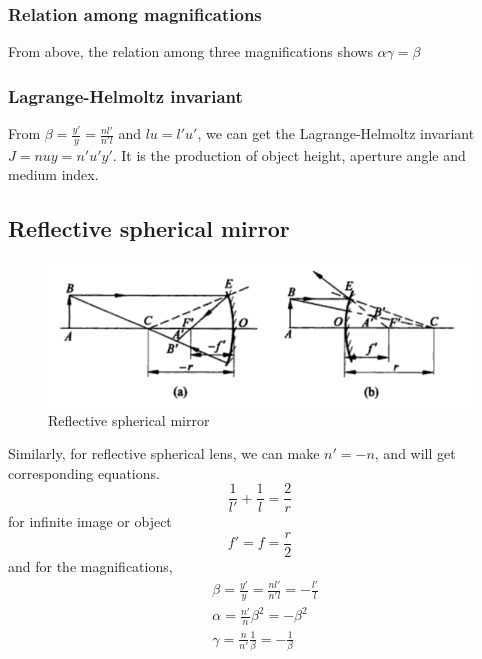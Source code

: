 \documentclass[../main.tex]{subfiles}
\begin{document}
	\subsubsection{Relation among magnifications}
	From above, the relation among three magnifications shows $\alpha\gamma=\beta$
	\subsubsection{Lagrange-Helmoltz invariant}
	From $\beta=\frac{y'}{y}=\frac{nl'}{n'l}$ and $lu=l'u'$, we can get the Lagrange-Helmoltz invariant $J=nuy=n'u'y'$. It is the production of object height, aperture angle and medium index.
	\subsection{Reflective spherical mirror}
	\begin{figure}[h!]
		\centering
		\includegraphics[scale=0.5]{../graphics/Geometrical_optics10.png}
		\caption{Reflective spherical mirror}
		\label{fig:Reflective}
	\end{figure}
	Similarly, for reflective spherical lens, we can make $n'=-n$, and will get corresponding equations.
	\begin{equation}
		\frac{1}{l'}+\frac{1}{l}=\frac{2}{r}
	\end{equation}
	for infinite image or object
	\begin{equation}
		f'=f=\frac{r}{2}
	\end{equation}
	and for the magnifications,
	\begin{align}
		&\beta=\frac{y'}{y}=\frac{nl'}{n'l}=-\frac{l'}{l}\\
		&\alpha=\frac{n'}{n}\beta^2=-\beta^2\\
		&\gamma=\frac{n}{n'}\frac{1}{\beta}=-\frac{1}{\beta}
	\end{align}
\end{document}
